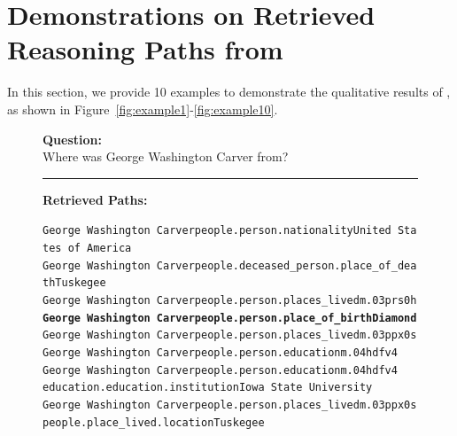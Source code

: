 \section{Demonstrations on Retrieved Reasoning Paths from \proj}
In this section, we provide 10 examples to demonstrate the qualitative results of \proj, as shown in Figure~\ref{fig:example1}-\ref{fig:example10}.

\begin{figure}[t]
\begin{tcolorbox}[colback=gray!5!white,
                  colframe=gray!75!black,
                  title=WEBQSP-WebQTest-7]
\scriptsize

\textbf{Question:}\\
Where was George Washington Carver from?

\rule{\linewidth}{0.4pt}

\textbf{Retrieved Paths:}\\[2pt]
{\raggedright
\texttt{George Washington Carver\patharrow people.person.nationality\patharrow United States of America}\\[6pt]

\texttt{George Washington Carver\patharrow people.deceased\_person.place\_of\_death\patharrow Tuskegee}\\[6pt]

\texttt{George Washington Carver\patharrow people.person.places\_lived\patharrow m.03prs0h}\\[6pt]

\texttt{\textbf{George Washington Carver\patharrow people.person.place\_of\_birth\patharrow Diamond}}\\[6pt]

\texttt{George Washington Carver\patharrow people.person.places\_lived\patharrow m.03ppx0s}\\[6pt]

\texttt{George Washington Carver\patharrow people.person.education\patharrow m.04hdfv4}\\[6pt]

\texttt{George Washington Carver\patharrow people.person.education\patharrow m.04hdfv4\patharrow \\ education.education.institution\patharrow Iowa State University}\\[6pt]

\texttt{George Washington Carver\patharrow people.person.places\_lived\patharrow m.03ppx0s\patharrow \\ people.place\_lived.location\patharrow Tuskegee}\\[6pt]

}
\end{tcolorbox}
\end{figure}
